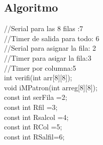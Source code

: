 \documentclass{article}
\begin{document}
\subsection{Algoritmo}
//Serial para las 8 filas :7\\
//Timer de salida para todo: 6\\
//Serial para asignar la fila: 2\\
//Timer para asigar la fila:3\\
//Timer por columna:5\\
int verifi(int arr[8][8]);\\
void iMPatron(int arreg[8][8]);\\

const int serFila =2;\\
const int Rfil =3;\\
const int Rsalcol =4;\\
const int RCol =5;\\
const int RSalfil=6;\\
\end{document}
